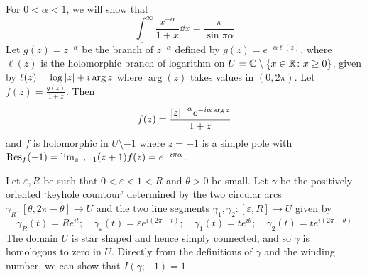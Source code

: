 \begin{example}
	For \( 0 < \alpha < 1 \), we will show that
	\[ \int_0^\infty \frac{x^{-\alpha}}{1+x} \dd{x} = \frac{\pi}{\sin \pi \alpha} \]
	Let \( g(z) = z^{-\alpha} \) be the branch of \( z^{-\alpha} \) defined by \( g(z) = e^{-\alpha \ell(z)} \), where \( \ell(z) \) is the holomorphic branch of logarithm on \( U = \mathbb C \setminus \qty{x \in \mathbb R \colon x \geq 0} \). given by \( \ell(z) = \log \abs{z} + i \arg z \) where \( \arg(z) \) takes values in \( (0,2\pi) \).
	Let \( f(z) = \frac{g(z)}{1+z} \).
	Then
	\[ f(z) = \frac{\abs{z}^{-\alpha} e^{-i\alpha \arg z}}{1+z} \]
	and \( f \) is holomorphic in \( U \setminus \qty{-1} \) where \( z = -1 \) is a simple pole with \( \Res_f(-1) = \lim_{z \to -1}(z+1)f(z) = e^{-i\pi \alpha} \).

	Let \( \varepsilon, R \) be such that \( 0 < \varepsilon < 1 < R \) and \( \theta > 0 \) be small.
	Let \( \gamma \) be the positively-oriented `keyhole countour' determined by the two circular arcs \( \gamma_R \colon [\theta,2\pi-\theta] \to U \) and the two line segments \( \gamma_1, \gamma_2 \colon [\varepsilon, R] \to U \) given by
	\[ \gamma_R(t) = Re^{it};\quad \gamma_\varepsilon(t) = \varepsilon e^{i(2\pi - t)};\quad \gamma_1(t) = te^{i\theta};\quad \gamma_2(t) = te^{i(2\pi - \theta)} \]
	The domain \( U \) is star shaped and hence simply connected, and so \( \gamma \) is homologous to zero in \( U \).
	Directly from the definitions of \( \gamma \) and the winding number, we can show that \( I(\gamma; -1) = 1 \).


\end{example}
